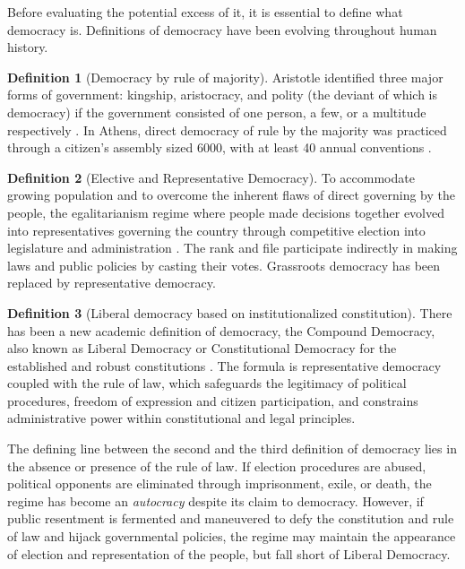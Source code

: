 \documentclass{scrartcl}
\theoremstyle{definition}
\newtheorem{definition}{Definition}
\begin{document}
Before evaluating the potential excess of it, it is essential to define what democracy is. Definitions of democracy have been evolving throughout human history. 


\begin{definition}[Democracy by rule of majority]
Aristotle identified three major forms of government: kingship, aristocracy, and polity (the deviant of which is democracy) if the government consisted of one person, a few, or a multitude respectively \autocite{arispol}. In Athens, direct democracy of rule by the majority was practiced through a citizen's assembly sized 6000, with at least 40 annual conventions \autocite{Bao2018}. 
\end{definition}

\begin{definition}[Elective and Representative Democracy]
To accommodate growing population and to overcome the inherent flaws of direct governing by the people, the egalitarianism regime where people made decisions together evolved into representatives governing the country through competitive election into legislature and administration \autocite{capsocdem}. The rank and file participate indirectly in making laws and public policies by casting their votes. Grassroots democracy has been replaced by representative democracy. 
\end{definition}

\begin{definition}[Liberal democracy based on institutionalized constitution]
There has been a new academic definition of democracy, the Compound Democracy, also known as Liberal Democracy or Constitutional Democracy for the established and robust constitutions \autocite{Bao2018}. The formula is representative democracy coupled with the rule of law, which safeguards the legitimacy of political procedures, freedom of expression and citizen participation, and constrains administrative power within constitutional and legal principles. 
\end{definition}

The defining line between the second and the third definition of democracy lies in the absence or presence of the rule of law. If election procedures are abused, political opponents are eliminated through imprisonment, exile, or death, the regime has become an \emph{autocracy} despite its claim to democracy. However, if public resentment is fermented and maneuvered to defy the constitution and rule of law and hijack governmental policies, the regime may maintain the appearance of election and representation of the people, but fall short of Liberal Democracy. 
\end{document}
